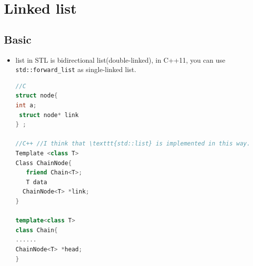 \documentclass[a4paper,11pt,twoside]{book}
\begin{document}
	
	
\section{Linked list}
\subsection{Basic}
\begin{itemize}
\item list in STL is bidirectional list(double-linked), in C++11, you can use \texttt{std::forward\_list} as single-linked list. 

\begin{lstlisting}[frame=single, language=c++]
//C 
struct node{ 
int a; 
 struct node* link
} ;

//C++ //I think that \texttt{std::list} is implemented in this way.
Template <class T>
Class ChainNode{
   friend Chain<T>;
   T data
  ChainNode<T> *link;
}

template<class T>
class Chain{
......
ChainNode<T> *head;
}
\end{lstlisting}

\end{itemize}
\end{document}
